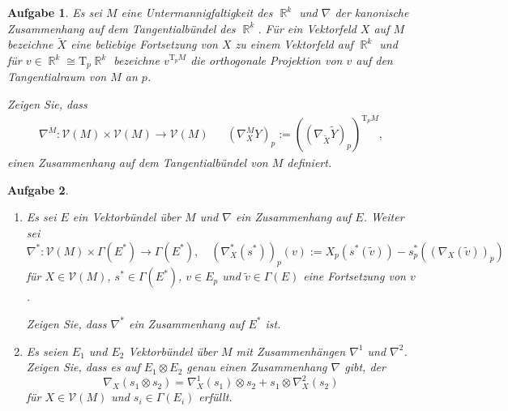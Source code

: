 \documentclass[paper=A4, twoside, chapterprefix=true, bibliography=totoc, headsepline]{scrbook}
\DeclareMathOperator{\R}{\mathbb{R}}
\newcommand{\tensor}{\otimes}
\theoremstyle{plain}
\theoremstyle{nonumberplain}
\theoremstyle{empty}
\theoremstyle{break}
\newtheorem{Aufg}{Aufgabe}
\begin{document}
\begin{Aufg}
Es sei $M$ eine Untermannigfaltigkeit des $\R^k$ und $\nabla$ der kanonische Zusammenhang auf dem Tangentialbündel des $\R^k$. Für ein Vektorfeld $X$ auf $M$ bezeichne $\tilde{X}$ eine beliebige Fortsetzung von $X$ zu einem Vektorfeld auf $\R^k$ und für $v\in \R^k \cong \mathrm{T}_p\R^k$ bezeichne $v^{\mathrm{T}_pM}$ die orthogonale Projektion von $v$ auf den Tangentialraum von $M$ an $p$. 

Zeigen Sie, dass
\begin{align*}
	\nabla^M:\mathcal{V}(M) \times \mathcal{V}(M) \to \mathcal{V}(M) && (\nabla^M_X Y)_p:=((\nabla_{\tilde{X}} \tilde{Y})_p)^{\mathrm{T}_pM},
\end{align*}
einen Zusammenhang auf dem Tangentialbündel von $M$ definiert.
\end{Aufg}

\begin{Aufg}
\begin{enumerate}[label=\alph*),leftmargin=*,widest=b]
\item
	Es sei $E$ ein Vektorbündel über $M$ und $\nabla$ ein Zusammenhang auf $E$. Weiter sei 
		\[\nabla^*:\mathcal{V}(M)\times \Gamma(E^*) \to \Gamma(E^*), \quad (\nabla^*_X(s^*))_p(v):=X_p(s^*(\tilde{v}))-s^*_p((\nabla_X(\tilde{v}))_p)\]
	für $X\in \mathcal{V}(M)$, $s^* \in \Gamma(E^*)$, $v \in E_p$ und $\tilde{v}\in \Gamma(E)$ eine Fortsetzung von $v$. 

	Zeigen Sie, dass $\nabla^*$ ein Zusammenhang auf $E^*$ ist.
\item
	Es seien $E_1$ und $E_2$ Vektorbündel über $M$ mit Zusammenhängen $\nabla^1$ und $\nabla^2$. Zeigen Sie, dass es auf $E_1 \tensor E_2$ genau einen Zusammenhang $\nabla$ gibt, der  \[\nabla_X(s_1 \tensor s_2)=\nabla^1_X(s_1) \tensor s_2 + s_1 \tensor \nabla^2_X(s_2)\] für $X \in \mathcal{V}(M)$ und $s_i \in \Gamma(E_i)$ erfüllt.
\end{enumerate}\end{Aufg}
\end{document}
